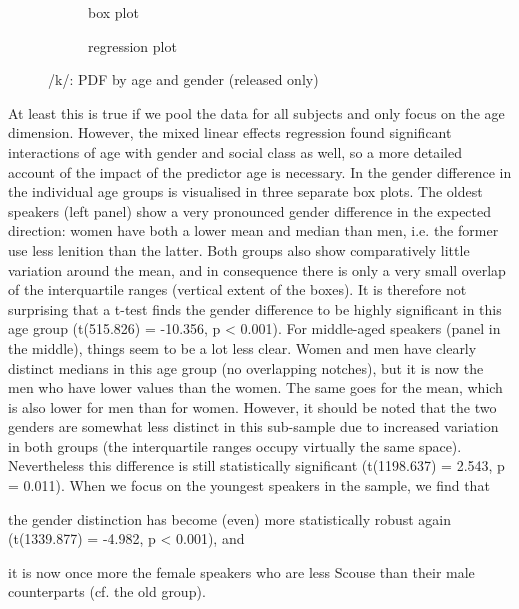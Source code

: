\begin{figure}
	
	\begin{subfigure}{.49\textwidth}
		
			\resizebox{\linewidth}{!}{} 
		\caption{box plot}
		\label{fig.box.k.agegender}
	\end{subfigure}
	\begin{subfigure}{.49\textwidth}
		
			\resizebox{\linewidth}{!}{}
		\caption{regression plot}
		\label{fig.scatter.k.agegender}
	\end{subfigure}
	\caption{/k/: PDF by age and gender (released only)}
\end{figure}

At least this is true if we pool the data for all subjects and only focus on the age dimension.
However, the mixed linear effects regression found significant interactions of age with gender and social class as well, so a more detailed account of the impact of the predictor age is necessary.
In  the gender difference in the individual age groups is visualised in three separate box plots.
The oldest speakers (left panel) show a very pronounced gender difference in the expected direction: women have both a lower mean and median than men, i.e. the former use less lenition than the latter.
Both groups also show comparatively little variation around the mean, and in consequence there is only a very small overlap of the interquartile ranges (vertical extent of the boxes).
It is therefore not surprising that a t-test finds the gender difference to be highly significant in this age group (t(515.826) = -10.356, p < 0.001).
For middle-aged speakers (panel in the middle), things seem to be a lot less clear.
Women and men have clearly distinct medians in this age group (no overlapping notches), but it is now the men who have lower  values than the women.
The same goes for the mean, which is also lower for men than for women.
However, it should be noted that the two genders are somewhat less distinct in this sub-sample due to increased variation in both groups (the interquartile ranges occupy virtually the same space).
Nevertheless this difference is still statistically significant (t(1198.637) = 2.543, p = 0.011).
When we focus on the youngest speakers in the sample, we find that
\begin{inparaenum}[(a)]
	\item the gender distinction has become (even) more statistically robust again (t(1339.877) = -4.982, p < 0.001), and
	\item it is now once more the female speakers who are less Scouse than their male counterparts (cf. the old group).
\end{inparaenum}


